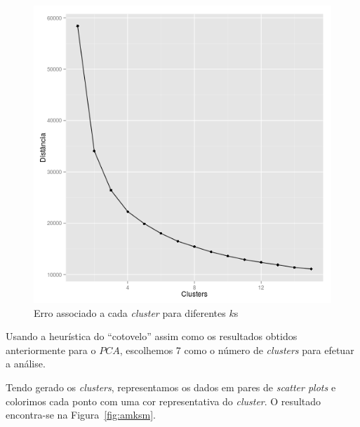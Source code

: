 \documentclass[10pt, conference, compsocconf]{IEEEtran}
\begin{document}
\begin{figure}[H]
  \centering
  \includegraphics[scale=0.4]{img/amv_kmdis.png}
  \caption{Erro associado a cada \textit{cluster} para diferentes $k$s}
  \label{fig:amkmdis}
\end{figure}

Usando a heurística do ``cotovelo'' assim como os resultados obtidos
anteriormente para o $PCA$, escolhemos 7 como o número de
\textit{clusters} para efetuar a análise.

Tendo gerado os \textit{clusters}, representamos os dados em pares de
\textit{scatter plots} e colorimos cada ponto com uma cor
representativa do \textit{cluster}. O resultado encontra-se na
Figura~\ref{fig:amksm}.
\end{document}
